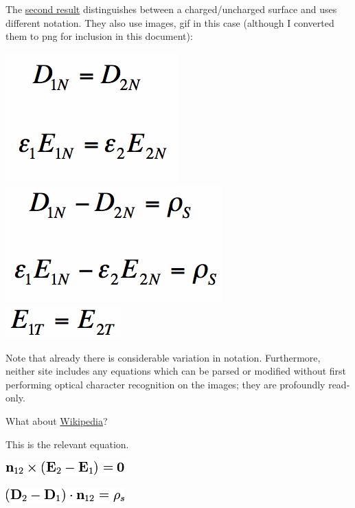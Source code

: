 \documentclass[12pt,letterpaper]{article}
\begin{document}
The
\href{http://www.antenna-theory.com/tutorial/electromagnetics/electric-field-boundary-conditions.php}
{second result} distinguishes between a charged/uncharged surface and uses different notation.
They also use images,
gif in this case
(although I converted them to png for inclusion in this document):
\begin{center}
\includegraphics[scale=0.3]{figures/normalDequal.png} \\
\includegraphics[scale=0.3]{figures/normalEfieldWithCharge.png} \\
\includegraphics[scale=0.3]{figures/tangentialEequal.png} \\
\end{center}

Note that already there is considerable variation in notation.
Furthermore, neither site includes any equations which can be parsed or modified
without first performing optical character recognition on the images;
they are profoundly read-only.

What about
\href{https://en.wikipedia.org/wiki/Interface_conditions_for_electromagnetic_fields}
{Wikipedia}?

This is the relevant equation.

\begin{center}
\includegraphics[scale=0.5]{figures/wikipedia1.png}

\includegraphics[scale=0.5]{figures/wikipedia2.png}
\end{center}
\end{document}
